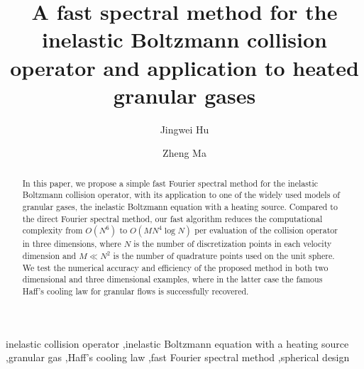 \documentclass[review,times]{elsarticle}
\begin{document}
\begin{frontmatter}

\title{A fast spectral method for the inelastic Boltzmann collision operator and application to heated granular gases}


\author[mymainaddress]{Jingwei Hu}

\author[mymainaddress]{Zheng Ma}

\address[mymainaddress]{Department of Mathematics, Purdue University\\150 N. University Street, West Lafayette, IN 47907, USA}

\begin{abstract}
In this paper, we propose a simple fast Fourier spectral method for the inelastic Boltzmann collision operator, with its application to one of the widely used models of granular gases, the inelastic Boltzmann equation with a heating source. Compared to the direct Fourier spectral method, our fast algorithm reduces the computational complexity from $O\left(N^6\right)$ to $O\left(MN^4\log N \right)$ per evaluation of the collision operator in three dimensions, where $N$ is the number of discretization points in each velocity dimension and $M \ll N^2$ is the number of quadrature points used on the unit sphere. We test the numerical accuracy and efficiency of the proposed method in both two dimensional and three dimensional examples, where in the latter case the famous Haff's cooling law for granular flows is successfully recovered.
\end{abstract}


\begin{keyword}
inelastic collision operator \sep inelastic Boltzmann equation with a heating source  \sep granular gas \sep  Haff's cooling law \sep fast Fourier spectral method \sep spherical design 
\end{keyword}

\end{frontmatter}
\end{document}
